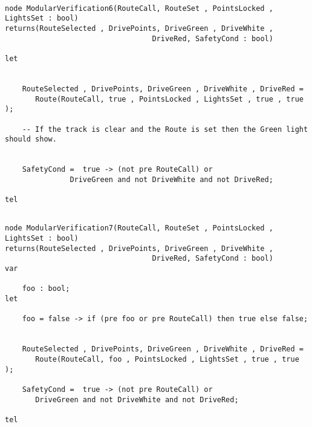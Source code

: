 \begin{verbatim}

node ModularVerification6(RouteCall, RouteSet , PointsLocked , LightsSet : bool)
returns(RouteSelected , DrivePoints, DriveGreen , DriveWhite ,
                                  DriveRed, SafetyCond : bool)
	
let


	RouteSelected , DrivePoints, DriveGreen , DriveWhite , DriveRed =
       Route(RouteCall, true , PointsLocked , LightsSet , true , true );
      
	-- If the track is clear and the Route is set then the Green light should show.


	SafetyCond =  true -> (not pre RouteCall) or  
               DriveGreen and not DriveWhite and not DriveRed;

tel

\end{verbatim}


\begin{verbatim}

node ModularVerification7(RouteCall, RouteSet , PointsLocked , LightsSet : bool)
returns(RouteSelected , DrivePoints, DriveGreen , DriveWhite ,
                                  DriveRed, SafetyCond : bool)
var

	foo : bool;
let

	foo = false -> if (pre foo or pre RouteCall) then true else false;
	

	RouteSelected , DrivePoints, DriveGreen , DriveWhite , DriveRed =
       Route(RouteCall, foo , PointsLocked , LightsSet , true , true );

	SafetyCond =  true -> (not pre RouteCall) or
       DriveGreen and not DriveWhite and not DriveRed;

tel
\end{verbatim}
